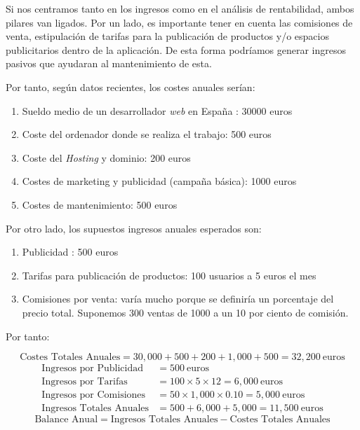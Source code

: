 	Si nos centramos tanto en los ingresos como en el análisis de rentabilidad, ambos pilares van ligados. Por un lado, es importante tener en cuenta las comisiones de venta, estipulación de tarifas para la publicación de productos y/o espacios publicitarios dentro de la aplicación. De esta forma podríamos generar ingresos pasivos que ayudaran al mantenimiento de esta.
	
	Por tanto, según datos recientes, los costes anuales serían:
	\begin{enumerate}
		\item Sueldo medio de un desarrollador \emph{web} en España : 30000 euros
		\item Coste del ordenador donde se realiza el trabajo: 500 euros
		\item Coste del \emph{Hosting} y dominio: 200 euros
		\item Costes de marketing y publicidad (campaña básica): 1000 euros
		\item Costes de mantenimiento: 500 euros
	\end{enumerate}
	
	Por otro lado, los supuestos ingresos anuales esperados son:
	\begin{enumerate}
		\item Publicidad : 500 euros
		\item Tarifas para publicación de productos: 100 usuarios a 5 euros el mes
		\item Comisiones por venta: varía mucho porque se definiría un porcentaje del precio total. Suponemos 300 ventas de 1000 a un 10 por ciento de comisión.
	\end{enumerate}
	
	Por tanto:
	
	\begin{equation}
		\text{Costes\ Totales\ Anuales} = 30,000 + 500 + 200 + 1,000 + 500 = 32,200 \ \text{euros}
	\end{equation}
	\begin{align}
		\text{Ingresos\ por\ Publicidad} &= 500 \ \text{euros} \\
		\text{Ingresos\ por\ Tarifas} &= 100 \times 5 \times 12 = 6,000 \ \text{euros} \\
		\text{Ingresos\ por\ Comisiones} &= 50 \times 1,000 \times 0.10 = 5,000 \ \text{euros} \\
		\text{Ingresos\ Totales\ Anuales} &= 500 + 6,000 + 5,000 = 11,500 \ \text{euros}
	\end{align}
	\begin{equation}
		\text{Balance\ Anual} = \text{Ingresos\ Totales\ Anuales} - \text{Costes\ Totales\ Anuales}
	\end{equation}

